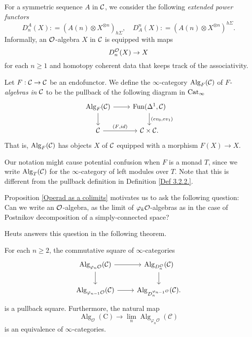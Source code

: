 For a symmetric sequence $A$ in ${\mathcal{C}}$, we consider the following \emph{extended power functors}
\begin{equation}
\label{extended power}
    D^{A}_n(X): = (A(n)\otimes X^{\otimes n })_{h\Sigma}, 
\quad
D_{A}^n(X): = (A(n)\otimes X^{\otimes n })^{h\Sigma}.
\end{equation}
Informally, an ${\mathcal{O}}$-algebra $X$ in ${\mathcal{C}}$ is equipped with maps
$$
D^{{\mathcal{O}}}_n(X) \to X
$$
for each $n\geq 1$ and homotopy coherent data that keeps track of the associativity.

\begin{definition}
\label{Def 3.2.2.}
Let $F:{\mathcal{C}}\to {\mathcal{C}}$ be an endofunctor.
	We define the $\infty$-category $\operatorname{Alg}_{F}({\mathcal{C}})$ of \emph{$F$-algebras in ${\mathcal{C}}$} to be the pullback of the following diagram in $\operatorname{Cat}_{\infty}$
\[
\begin{tikzcd}
	\Alg_{F}(\CC) & 
	\Fun(\Delta^1, \CC)\\
	\CC & 
	\CC \times \CC
	\arrow[from=1-1, to= 1-2]
	\arrow[from=1-1, to=2-1]
	\arrow[from=1-2, to=2-2, "(ev_0\text{,} ev_1)"]
	\arrow[from=2-1, to= 2-2, "(F\text{,} id)"].
\end{tikzcd}
\]
That is, $\operatorname{Alg}_{F}({\mathcal{C}})$ has objects $X$ of ${\mathcal{C}}$ equipped with a morphism $F(X)\to X$.
\end{definition}

\begin{remark}
Our notation might cause potential confusion when $F$ is a monad $T$, since we write $\operatorname{Alg}_T({\mathcal{C}})$ for the $\infty$-category of left modules over $T$. Note that this is different from the pullback definition in Definition \ref{Def 3.2.2.}. 
\end{remark}

Proposition \ref{Operad as a colimits} motivates us to ask the following question: Can we write an ${\mathcal{O}}$-algebra, as the limit of $\varphi_k{\mathcal{O}}$-algebras as in the case of Postnikov decomposition of a simply-connected space? 

Heuts answers this question in the following theorem.
\begin{theorem}
\cite[Theorem 4.1]{Heuts_Koszul}
\label{Thm 4.1 of Heuts Koszul Duality paper}
For each $n \geq 2$, the commutative square of $\infty$-categories
\[
\begin{tikzcd}
	\Alg_{\varphi_n\CO}(\CC) & 
	\Alg_{D^{\CO}_{n}}(\CC)\\
	\Alg_{\varphi_{n-1}\CO} (\CC)  & 
	\Alg_{D_{n}^{\varphi_{n-1}\CO}}(\CC)
	\arrow[from=1-1, to= 1-2]
	\arrow[from=1-1, to=2-1]
	\arrow[from=1-2, to=2-2]
	\arrow[from=2-1, to= 2-2].
\end{tikzcd}
\]
is a pullback square. Furthermore, the natural map
$$
\operatorname{Alg}_{\mathcal{O}}(\mathrm{C}) \rightarrow \lim _{n} \operatorname{Alg}_{\varphi_{n} \mathcal{O}}(\mathcal{C})
$$
is an equivalence of $\infty$-categories.
\end{theorem}

